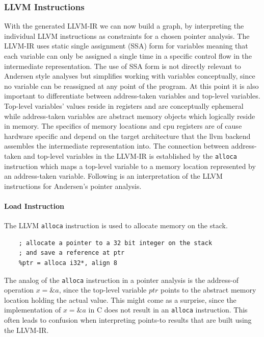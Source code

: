 \subsubsection{LLVM Instructions}
With the generated LLVM-IR we can now build a graph, by interpreting the individual LLVM instructions as constraints for a chosen pointer analysis.
The LLVM-IR uses static single assignment (SSA) form for variables meaning that each variable can only be assigned a single time in a specific control flow in the intermediate representation.
The use of SSA form is not directly relevant to Andersen style analyses but simplifies working with variables conceptually, since no variable can be reassigned at any point of the program.
At this point it is also important to differentiate between address-taken variables and top-level variables.
Top-level variables' values reside in registers and are conceptually ephemeral while address-taken variables are abstract memory objects which logically reside in memory. The specifics of memory locations and cpu registers are of cause hardware specific and depend on the target architecture that the llvm backend assembles the intermediate representation into.
The connection between address-taken and top-level variables in the LLVM-IR is established by the \verb|alloca| instruction which maps a top-level variable to a memory location represented by an address-taken variable.
Following is an interpretation of the LLVM instructions for Andersen's pointer analysis.

\paragraph{Load Instruction}
The LLVM \verb|alloca| instruction is used to allocate memory on the stack.
\begin{verbatim}
    ; allocate a pointer to a 32 bit integer on the stack 
    ; and save a reference at ptr
    %ptr = alloca i32*, align 8
\end{verbatim}
The analog of the \verb|alloca| instruction in a pointer analysis is the address-of operation $x = \&a$, since the top-level variable $ptr$ points to the abstract memory location holding the actual value.
This might come as a surprise, since the implementation of $x = \&a$ in C does not result in an \verb|alloca| instruction. This often leads to confusion when interpreting points-to results that are built using the LLVM-IR.

